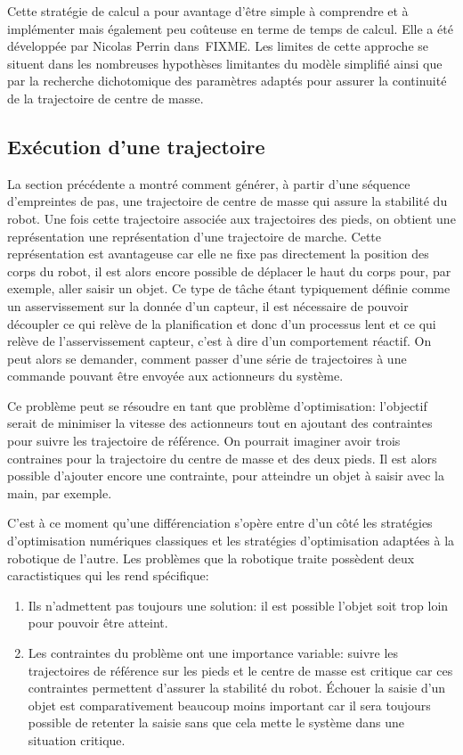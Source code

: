 Cette stratégie de calcul a pour avantage d'être simple à comprendre
et à implémenter mais également peu coûteuse en terme de temps de
calcul. Elle a été développée par Nicolas Perrin dans~FIXME. Les
limites de cette approche se situent dans les nombreuses hypothèses
limitantes du modèle simplifié ainsi que par la recherche dichotomique
des paramètres adaptés pour assurer la continuité de la trajectoire de
centre de masse.


\subsection{Exécution d'une trajectoire}


La section précédente a montré comment générer, à partir d'une
séquence d'empreintes de pas, une trajectoire de centre de masse qui
assure la stabilité du robot. Une fois cette trajectoire associée aux
trajectoires des pieds, on obtient une représentation une
représentation d'une trajectoire de marche. Cette représentation est
avantageuse car elle ne fixe pas directement la position des corps du
robot, il est alors encore possible de déplacer le haut du corps pour,
par exemple, aller saisir un objet. Ce type de tâche étant typiquement
définie comme un asservissement sur la donnée d'un capteur, il est
nécessaire de pouvoir découpler ce qui relève de la planification et
donc d'un processus lent et ce qui relève de l'asservissement capteur,
c'est à dire d'un comportement réactif. On peut alors se demander,
comment passer d'une série de trajectoires à une commande pouvant être
envoyée aux actionneurs du système.


Ce problème peut se résoudre en tant que problème d'optimisation:
l'objectif serait de minimiser la vitesse des actionneurs tout en
ajoutant des contraintes pour suivre les trajectoire de référence. On
pourrait imaginer avoir trois contraines pour la trajectoire du centre
de masse et des deux pieds. Il est alors possible d'ajouter encore une
contrainte, pour atteindre un objet à saisir avec la main, par
exemple.


C'est à ce moment qu'une différenciation s'opère entre d'un côté les
stratégies d'optimisation numériques classiques et les stratégies
d'optimisation adaptées à la robotique de l'autre. Les problèmes que
la robotique traite possèdent deux caractistiques qui les rend
spécifique:
\begin{enumerate}
\item Ils n'admettent pas toujours une solution: il est possible
  l'objet soit trop loin pour pouvoir être atteint.
\item Les contraintes du problème ont une importance variable: suivre
  les trajectoires de référence sur les pieds et le centre de masse
  est critique car ces contraintes permettent d'assurer la stabilité
  du robot. Échouer la saisie d'un objet est comparativement beaucoup
  moins important car il sera toujours possible de retenter la saisie
  sans que cela mette le système dans une situation critique.
\end{enumerate}

